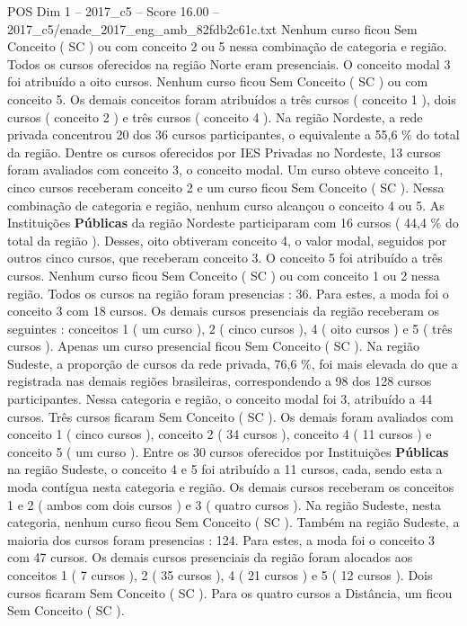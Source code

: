 \begin{textsample}{POS Dim 1 – 2017\_c5 – Score 16.00 – 2017\_c5/enade\_2017\_eng\_amb\_82fdb2c61c.txt}
Nenhum curso ficou Sem Conceito ( SC ) ou com conceito 2 ou 5 nessa combinação de categoria e região.
Todos os cursos oferecidos na região Norte eram presenciais.
O conceito modal 3 foi atribuído a oito cursos.
Nenhum curso ficou Sem Conceito ( SC ) ou com conceito 5.
Os demais conceitos foram atribuídos a três cursos ( conceito 1 ), dois cursos ( conceito 2 ) e três cursos ( conceito 4 ).
Na região Nordeste, a rede privada concentrou 20 dos 36 cursos participantes, o equivalente a 55,6 \% do total da região.
Dentre os cursos oferecidos por IES Privadas no Nordeste, 13 cursos foram avaliados com conceito 3, o conceito modal.
Um curso obteve conceito 1, cinco cursos receberam conceito 2 e um curso ficou Sem Conceito ( SC ).
Nessa combinação de categoria e região, nenhum curso alcançou o conceito 4 ou 5.
As Instituições \textbf{Públicas} da região Nordeste participaram com 16 cursos ( 44,4 \% do total da região ).
Desses, oito obtiveram conceito 4, o valor modal, seguidos por outros cinco cursos, que receberam conceito 3.
O conceito 5 foi atribuído a três cursos.
Nenhum curso ficou Sem Conceito ( SC ) ou com conceito 1 ou 2 nessa região.
Todos os cursos na região foram presencias : 36.
Para estes, a moda foi o conceito 3 com 18 cursos.
Os demais cursos presenciais da região receberam os seguintes : conceitos 1 ( um curso ), 2 ( cinco cursos ), 4 ( oito cursos ) e 5 ( três cursos ).
Apenas um curso presencial ficou Sem Conceito ( SC ).
Na região Sudeste, a proporção de cursos da rede privada, 76,6 \%, foi mais elevada do que a registrada nas demais regiões brasileiras, correspondendo a 98 dos 128 cursos participantes.
Nessa categoria e região, o conceito modal foi 3, atribuído a 44 cursos.
Três cursos ficaram Sem Conceito ( SC ).
Os demais foram avaliados com conceito 1 ( cinco cursos ), conceito 2 ( 34 cursos ), conceito 4 ( 11 cursos ) e conceito 5 ( um curso ).
Entre os 30 cursos oferecidos por Instituições \textbf{Públicas} na região Sudeste, o conceito 4 e 5 foi atribuído a 11 cursos, cada, sendo esta a moda contígua nesta categoria e região.
Os demais cursos receberam os conceitos 1 e 2 ( ambos com dois cursos ) e 3 ( quatro cursos ).
Na região Sudeste, nesta categoria, nenhum curso ficou Sem Conceito ( SC ).
Também na região Sudeste, a maioria dos cursos foram presencias : 124.
Para estes, a moda foi o conceito 3 com 47 cursos.
Os demais cursos presenciais da região foram alocados aos conceitos 1 ( 7 cursos ), 2 ( 35 cursos ), 4 ( 21 cursos ) e 5 ( 12 cursos ).
Dois cursos ficaram Sem Conceito ( SC ).
Para os quatro cursos a Distância, um ficou Sem Conceito ( SC ).

\end{textsample}
